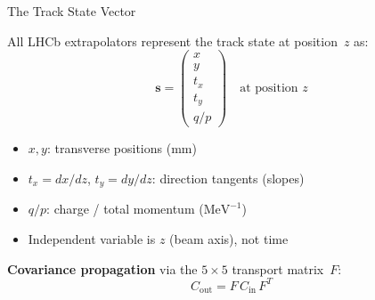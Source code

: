 \documentclass[aspectratio=169, 11pt]{beamer}
\newcommand{\qop}{q/p}
\newcommand{\bvec}[1]{\mathbf{#1}}
\newcommand{\vstate}{\bvec{s}}
\newcommand{\tx}{t_x}
\newcommand{\ty}{t_y}
\begin{document}
\begin{frame}{The Track State Vector}

All LHCb extrapolators represent the track state at position~$z$ as:
\begin{equation*}
  \vstate = \begin{pmatrix} x \\ y \\ \tx \\ \ty \\ \qop \end{pmatrix}
  \quad\text{at position } z
\end{equation*}

\begin{itemize}
  \item $x, y$: transverse positions (mm)
  \item $\tx = dx/dz$, $\ty = dy/dz$: direction tangents (slopes)
  \item $\qop$: charge / total momentum ($\text{MeV}^{-1}$)
  \item Independent variable is $z$ (beam axis), not time
\end{itemize}

\vspace{6pt}
\textbf{Covariance propagation} via the $5\times5$ transport matrix~$F$:
\begin{equation*}
  C_\text{out} = F \, C_\text{in} \, F^T
\end{equation*}
\end{frame}
\end{document}
